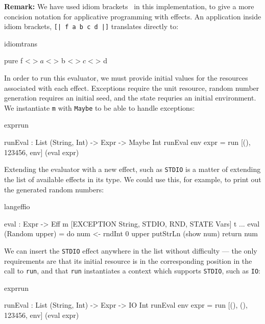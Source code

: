 \noindent
\textbf{Remark:}
We have used idiom brackets~\cite{McBride2007} in this implementation, to
give a more concision notation for applicative programming with effects.
An application inside idiom brackets, \texttt{[| f a b c d |]} translates
directly to:

\begin{SaveVerbatim}{idiomtrans}

pure f <$> a <$> b <$> c <$> d

\end{SaveVerbatim}

\noindent
In order to run this evaluator, we must provide initial values for the resources
associated with each effect. Exceptions require the unit resource, random
number generation requires an initial seed, and the state requries an initial
environment. We instantiate \texttt{m} with \texttt{Maybe} to be able
to handle exceptions:

\begin{SaveVerbatim}{exprrun}

runEval : List (String, Int) -> Expr -> Maybe Int
runEval env expr = run [(), 123456, env] (eval expr)

\end{SaveVerbatim}

\noindent
Extending the evaluator with a new effect, such as \texttt{STDIO} is a matter
of extending the list of available effects in its type.  We could use this, for
example, to print out the generated random numbers:

\begin{SaveVerbatim}{langeffio}

eval : Expr -> 
       Eff m [EXCEPTION String, STDIO, 
              RND, STATE Vars] t
...
eval (Random upper) = do num <- rndInt 0 upper
                         putStrLn (show num)
                         return num

\end{SaveVerbatim}

\noindent
We can insert the \texttt{STDIO} effect anywhere in the list without difficulty
--- the only requirements are that its initial resource is in the corresponding
position in the call to \texttt{run}, and that \texttt{run} instantiates
a context which supports \texttt{STDIO}, such as \texttt{IO}:

\begin{SaveVerbatim}{exprrun}

runEval : List (String, Int) -> Expr -> IO Int
runEval env expr 
    = run [(), (), 123456, env] (eval expr)

\end{SaveVerbatim}
